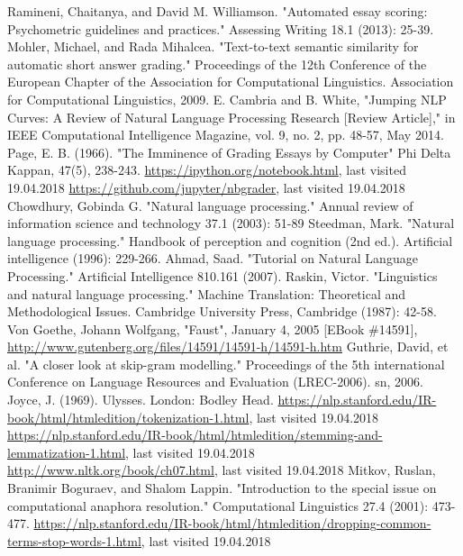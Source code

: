 \documentclass[rnd]{mas_report}
\begin{document}
\begin{thebibliography}{3}
 Ramineni, Chaitanya, and David M. Williamson. "Automated essay scoring: Psychometric guidelines and practices." Assessing Writing 18.1 (2013): 25-39. 
 Mohler, Michael, and Rada Mihalcea. "Text-to-text semantic similarity for automatic short answer grading." Proceedings of the 12th Conference of the European Chapter of the Association for Computational Linguistics. Association for Computational Linguistics, 2009.
 E. Cambria and B. White, "Jumping NLP Curves: A Review of Natural Language Processing Research [Review Article]," in IEEE Computational Intelligence Magazine, vol. 9, no. 2, pp. 48-57, May 2014.
  Page, E. B. (1966). "The Imminence of Grading Essays by Computer" Phi Delta Kappan, 47(5), 238-243.
 \url{https://ipython.org/notebook.html}, last visited 19.04.2018
 \url{https://github.com/jupyter/nbgrader}, last visited 19.04.2018
 Chowdhury, Gobinda G. "Natural language processing." Annual review of information science and technology 37.1 (2003): 51-89
 Steedman, Mark. "Natural language processing." Handbook of perception and cognition (2nd ed.). Artificial intelligence (1996): 229-266.
 Ahmad, Saad. "Tutorial on Natural Language Processing." Artificial Intelligence 810.161 (2007).
  Raskin, Victor. "Linguistics and natural language processing." Machine Translation: Theoretical and Methodological Issues. Cambridge University Press, Cambridge (1987): 42-58.
 Von Goethe, Johann Wolfgang, "Faust", January 4, 2005 [EBook \#14591], \url{http://www.gutenberg.org/files/14591/14591-h/14591-h.htm}
 Guthrie, David, et al. "A closer look at skip-gram modelling." Proceedings of the 5th international Conference on Language Resources and Evaluation (LREC-2006). sn, 2006.
 Joyce, J. (1969). Ulysses. London: Bodley Head.
 \url{https://nlp.stanford.edu/IR-book/html/htmledition/tokenization-1.html}, last visited 19.04.2018
 \url{https://nlp.stanford.edu/IR-book/html/htmledition/stemming-and-lemmatization-1.html}, last visited 19.04.2018
 \url{http://www.nltk.org/book/ch07.html}, last visited 19.04.2018
 Mitkov, Ruslan, Branimir Boguraev, and Shalom Lappin. "Introduction to the special issue on computational anaphora resolution." Computational Linguistics 27.4 (2001): 473-477.
 \url{https://nlp.stanford.edu/IR-book/html/htmledition/dropping-common-terms-stop-words-1.html}, last visited 19.04.2018

\end{thebibliography}
\end{document}
